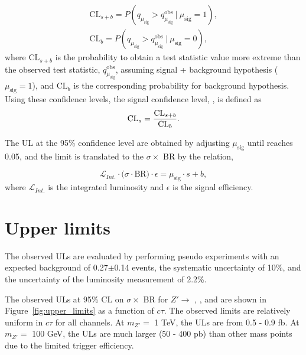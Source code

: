 \begin{align}
\mathrm{CL}_{s+b} = P(q_{\mu_{\mathrm{sig}}} > q_{\mu_{\mathrm{sig}}}^{\mathrm{obs}}~|~\mu_{\mathrm{sig}} = 1), \nonumber \\
\mathrm{CL}_{b} = P(q_{\mu_{\mathrm{sig}}} > q_{\mu_{\mathrm{sig}}}^{\mathrm{obs}}~|~\mu_{\mathrm{sig}} = 0),
\label{eq:p_values}
\end{align}
%
where $\mathrm{CL}_{s+b}$ is the probability to obtain a test statistic value more extreme than the observed test statistic, $q_{\mu_{\mathrm{sig}}}^{\mathrm{obs}}$, assuming signal + background hypothesis ($\mu_{\mathrm{sig}}=1$), and $\mathrm{CL}_{b}$ is the corresponding probability for background hypothesis. Using these confidence levels, the signal confidence level, \CLs, is defined as
\begin{align}
\mathrm{CL}_{s} =  \dfrac{\mathrm{CL}_{s+b}}{\mathrm{CL}_{b}}.
\label{eq:cls}
\end{align}

The UL at the 95\% confidence level are obtained by adjusting $\mu_{\mathrm{sig}}$ until \CLs reaches 0.05, and the limit is translated to the $\sigma \times$ BR by the relation,

\begin{equation}
\label{eq:signal_strength}
\mathcal{L}_{Int.} \cdot \big(\sigma \cdot \mathrm{BR} \big) \cdot \epsilon = \mu_{\mathrm{sig}}\cdot s + b,
\end{equation}
%
where $\mathcal{L}_{Int.}$ is the integrated luminosity and  $\epsilon$ is the signal efficiency.

\section{Upper limits}
The observed ULs are evaluated by performing pseudo experiments with an expected background of 0.27$\pm$0.14 events, the systematic uncertainty of 10\%, and the uncertainty of the luminosity measurement of 2.2\%.

The observed ULs at 95\% CL on $\sigma \times$ BR for $Z' \rightarrow$ \mumu, \ee, and \emu are shown in Figure~\ref{fig:upper_limits} as a function of $c\tau$. The observed limits are relatively uniform in $c\tau$ for all channels. At $m_{Z'}=$ 1 TeV, the ULs are from 0.5 - 0.9 fb. At $m_{Z'}=$ 100 GeV, the ULs are much larger (50 - 400 pb) than other mass points due to the limited trigger efficiency.


